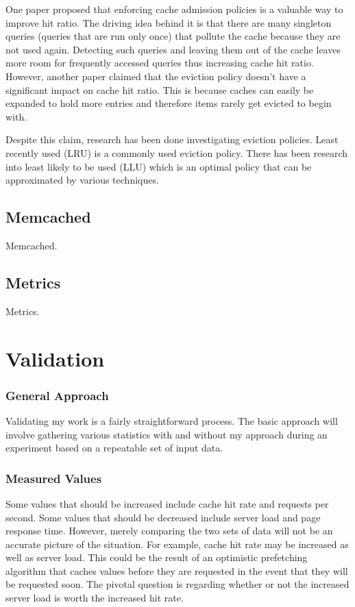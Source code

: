 \documentclass[12pt]{ucthesis}
\begin{document}
One paper proposed that enforcing cache admission policies is a valuable way to improve hit ratio.\cite{cacheAdmissionPolicies}
The driving idea behind it is that there are many singleton queries (queries that are run only once) that pollute the cache because they are not used again.
Detecting such queries and leaving them out of the cache leaves more room for frequently accessed queries thus increasing cache hit ratio.
However, another paper claimed that the eviction policy doesn't have a significant impact on cache hit ratio.\cite{refreshingPerspectiveSearch}
This is because caches can easily be expanded to hold more entries and therefore items rarely get evicted to begin with.\cite{refreshingPerspectiveSearch}

Despite this claim, research has been done investigating eviction policies.
Least recently used (LRU) is a commonly used eviction policy.
There has been research into least likely to be used (LLU) which is an optimal policy that can be approximated by various techniques.


\section{Memcached}
Memcached.

\section{Metrics}
Metrics.

\chapter{Validation}
\label{validation}

\subsection{General Approach}
Validating my work is a fairly straightforward process.
The basic approach will involve gathering various statistics with and without my approach during an experiment based on a repeatable set of input data. %

\subsection{Measured Values}
Some values that should be increased include cache hit rate and requests per second.
Some values that should be decreased include server load and page response time.
However, merely comparing the two sets of data will not be an accurate picture of the situation.
For example, cache hit rate may be increased as well as server load.
This could be the result of an optimistic prefetching algorithm that caches values before they are requested in the event that they will be requested soon.
The pivotal question is regarding whether or not the increased server load is worth the increased hit rate.
\end{document}

